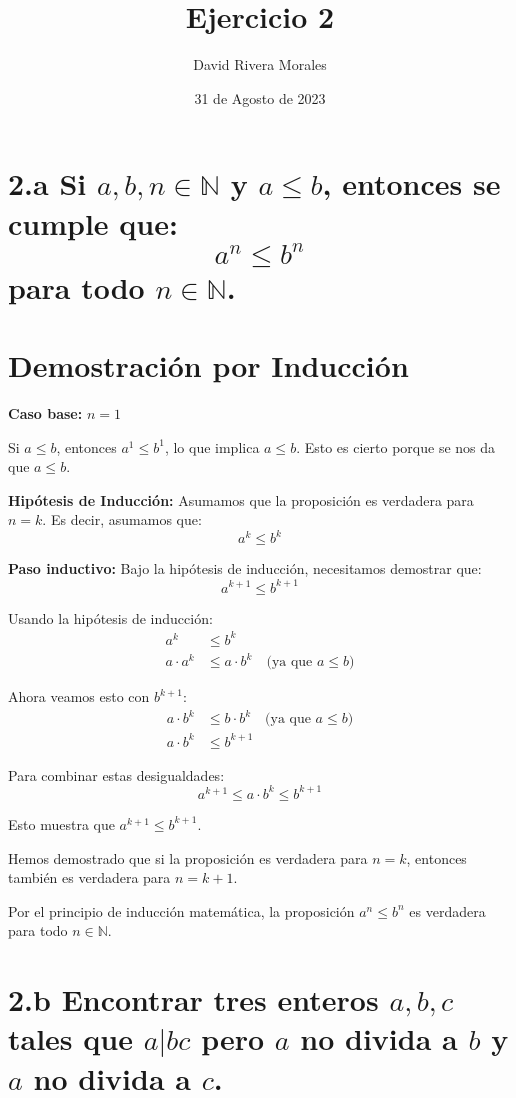 \documentclass[12pt,a4paper]{article}
\begin{document}
\title{Ejercicio 2}
\author{David Rivera Morales}
\date{31 de Agosto de 2023}
\maketitle


\section*{2.a Si \(a, b, n \in \mathbb{N}\) y \(a \leq b\), entonces se cumple que:
\[a^n \leq b^n\] para todo \(n \in \mathbb{N}\).}


\section*{Demostración por Inducción}

\textbf{Caso base:} \(n = 1\)

Si \(a \leq b\), entonces \(a^1 \leq b^1\), lo que implica \(a \leq b\). Esto es cierto porque se nos da que \(a \leq b\).

\textbf{Hipótesis de Inducción:} Asumamos que la proposición es verdadera para \(n = k\). Es decir, asumamos que:
\[a^k \leq b^k\]

\textbf{Paso inductivo:} Bajo la hipótesis de inducción, necesitamos demostrar que:
\[a^{k+1} \leq b^{k+1}\]


Usando la hipótesis de inducción:
\begin{align*}
a^k &\leq b^k \\
a \cdot a^k &\leq a \cdot b^k \quad \text{(ya que } a \leq b \text{)}
\end{align*}

Ahora veamos esto con \( b^{k+1} \):
\begin{align*}
a \cdot b^k &\leq b \cdot b^k \quad \text{(ya que } a \leq b \text{)} \\
a \cdot b^k &\leq b^{k+1}
\end{align*}

Para combinar estas desigualdades:
\[
a^{k+1} \leq a \cdot b^k \leq b^{k+1}
\]

Esto muestra que \( a^{k+1} \leq b^{k+1} \).


Hemos demostrado que si la proposición es verdadera para \(n = k\), entonces también es verdadera para \(n = k + 1\).

Por el principio de inducción matemática, la proposición \(a^n \leq b^n\) es verdadera para todo \(n \in \mathbb{N}\).

\section*{2.b Encontrar tres enteros \(a, b, c\) tales que \(a | bc\) pero \(a\) no divida a \(b\) y \(a\) no divida a \(c\).}
\end{document}
